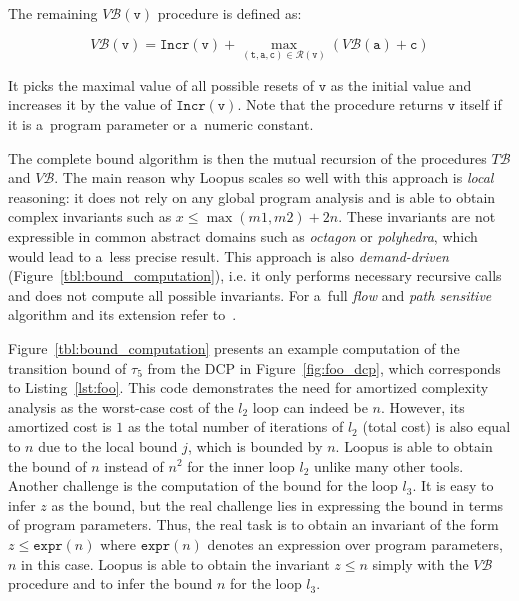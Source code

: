 \documentclass{ExcelAtFIT}
\begin{document}
The remaining $V\mathcal{B}(\mathtt{v})$ procedure
is defined as:
\begin{linenomath}
\begin{equation*}
V\mathcal{B}(\mathtt{v}) =
\mathtt{Incr}(\mathtt{v}) +
\max\limits_{(\mathtt{t, a, c})\in
\mathcal{R}(\mathtt{v})}(
V\mathcal{B}(\mathtt{a}) + \mathtt{c})
\end{equation*}
\end{linenomath}
It picks the maximal value of all possible resets of
$\mathtt{v}$ as the initial value and increases it by
the value of $\mathtt{Incr(v)}$. Note that the
procedure returns $\mathtt{v}$ itself if it is
a~program parameter or a~numeric constant.

The complete bound algorithm is then
the mutual recursion of the procedures $T\mathcal{B}$
and $V\mathcal{B}$. The main reason why Loopus scales
so well with this approach is \textit{local} reasoning:
it does not rely on any global program  analysis and
is able to obtain complex invariants  such as
$x \leq \max(m1,m2) + 2n$. These invariants
are not expressible in common abstract domains such
as \textit{octagon} or \textit{polyhedra}, which
would lead to a~less precise result. This approach
is also \textit{demand-driven}
(Figure~\ref{tbl:bound_computation}), i.e. it only
performs necessary recursive calls and does not
compute all possible invariants. For a~full
\textit{flow} and \textit{path sensitive} algorithm
and its extension refer to~\cite{loopus-tool}.

Figure~\ref{tbl:bound_computation} presents an
example computation of the transition bound of
$\tau_5$ from the DCP in Figure~\ref{fig:foo_dcp},
which corresponds to Listing~\ref{lst:foo}. This code
demonstrates
the need for amortized complexity analysis as the
worst-case cost of the $l_2$ loop can indeed be
$n$. However, its amortized cost is $1$ as the
total number of iterations of $l_2$ (total cost) is also equal
to $n$ due to the local bound $j$, which is bounded by
$n$. Loopus is able to obtain the bound of $n$ instead
of $n^2$ for the inner loop $l_2$ unlike many other tools.
Another challenge is the computation of
the bound for the loop $l_3$. It is easy to infer $z$
as the bound, but the real challenge lies in expressing
the bound in terms of program parameters. Thus, the
real task is to obtain an invariant of the form
$z \leq \mathtt{expr}(n)$ where $\mathtt{expr}(n)$
denotes an expression over program parameters,
$n$ in this case. Loopus is able to obtain the
invariant $z \leq n$ simply with the $V\mathcal{B}$
procedure and to infer the bound $n$ for
the loop $l_3$.
\end{document}

